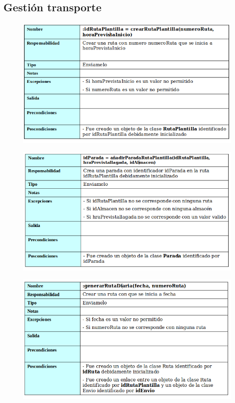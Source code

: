 \subsection{Gestión transporte}
\begin{figure}[H]
	\centering
	\includegraphics[width=16cm]{19}
\end{figure}
\begin{figure}[H]
	\centering
	\includegraphics[width=16cm]{20}
\end{figure}
\begin{figure}[H]
	\centering
	\includegraphics[width=16cm]{21}
\end{figure}
